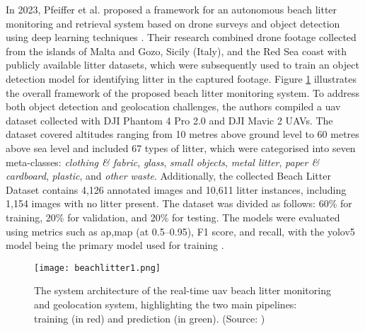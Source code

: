 In 2023, Pfeiffer et al. proposed a framework for an autonomous beach litter monitoring and retrieval system based on drone surveys and object detection using deep learning techniques \cite{beach_litter}. Their research combined drone footage collected from the islands of Malta and Gozo, Sicily (Italy), and the Red Sea coast with publicly available litter datasets, which were subsequently used to train an object detection model for identifying litter in the captured footage. Figure \ref{fig:beachlitter1} illustrates the overall framework of the proposed beach litter monitoring system. To address both object detection and geolocation challenges, the authors compiled a \gls{uav} dataset collected with DJI Phantom 4 Pro 2.0 and DJI Mavic 2 UAVs. The dataset covered altitudes ranging from 10 metres above ground level to 60 metres above sea level and included 67 types of litter, which were categorised into seven meta-classes: \textit{clothing \& fabric}, \textit{glass}, \textit{small objects}, \textit{metal litter}, \textit{paper \& cardboard}, \textit{plastic}, and \textit{other waste}.
Additionally, the collected Beach Litter Dataset contains 4,126 annotated images and 10,611 litter instances, including 1,154 images with no litter present. The dataset was divided as follows: 60\% for training, 20\% for validation, and 20\% for testing. The models were evaluated using metrics such as \gls{ap},\gls{map} (at 0.5–0.95), F1 score, and recall, with the \gls{yolo}v5 model being the primary model used for training \cite{beach_litter}. 

\begin{figure}[!htbp]
    \centering
    \texttt{[image: beachlitter1.png]}
    \caption{The system architecture of the real-time \gls{uav} beach litter monitoring and geolocation system, highlighting the two main pipelines: training (in red) and prediction (in green). (Source: \cite{beach_litter})}
    \label{fig:beachlitter1}
\end{figure}


